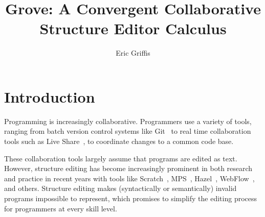\documentclass[nonacm, acmsmall, screen, review]{acmart}
\begin{document}
\title[Grove]{Grove: A Convergent Collaborative Structure Editor Calculus}


\author{Eric Griffis}


\maketitle



\section{Introduction}
\label{sec:introduction}


Programming is increasingly collaborative.
Programmers use a variety of tools, ranging from batch version control systems like Git~\cite{chacon_pro_2014} to real time collaboration tools such as Live Share~\cite{sole_visual_2018}, to coordinate changes to a common code base.

These collaboration tools largely assume that programs are edited as text.
However, structure editing has become increasingly prominent in both research and practice in recent years with tools like 
Scratch~\cite{resnick_scratch_2009}, 
MPS~\cite{voelter_language_2011},
Hazel~\cite{omar_hazelnut_2017}, 
WebFlow~\cite{noauthor_design_2014},
and others.
Structure editing makes (syntactically or semantically) invalid programs impossible to represent, which promises to simplify the editing process for programmers at every skill level.
\end{document}
